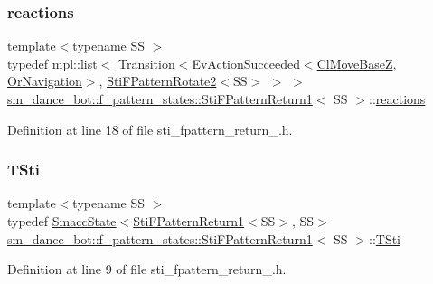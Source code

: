 \subsubsection{\texorpdfstring{reactions}{reactions}}
{\footnotesize\ttfamily template$<$typename SS $>$ \\
typedef mpl\+::list$<$ Transition$<$Ev\+Action\+Succeeded$<$\hyperlink{classmove__base__z__client_1_1ClMoveBaseZ}{Cl\+Move\+BaseZ}, \hyperlink{classsm__dance__bot_1_1OrNavigation}{Or\+Navigation}$>$, \hyperlink{structsm__dance__bot_1_1f__pattern__states_1_1StiFPatternRotate2}{Sti\+F\+Pattern\+Rotate2}$<$SS$>$ $>$ $>$ \hyperlink{structsm__dance__bot_1_1f__pattern__states_1_1StiFPatternReturn1}{sm\+\_\+dance\+\_\+bot\+::f\+\_\+pattern\+\_\+states\+::\+Sti\+F\+Pattern\+Return1}$<$ SS $>$\+::\hyperlink{structsm__dance__bot_1_1f__pattern__states_1_1StiFPatternReturn1_a2fcaf186ce44b90735584e304831f944}{reactions}}



Definition at line 18 of file sti\+\_\+fpattern\+\_\+return\+\_.\+h.

\mbox{\label{structsm__dance__bot_1_1f__pattern__states_1_1StiFPatternReturn1_afd0d5d7e8dc6ad87f7314176d86d919e}} 
\subsubsection{\texorpdfstring{T\+Sti}{TSti}}
{\footnotesize\ttfamily template$<$typename SS $>$ \\
typedef \hyperlink{classSmaccState}{Smacc\+State}$<$\hyperlink{structsm__dance__bot_1_1f__pattern__states_1_1StiFPatternReturn1}{Sti\+F\+Pattern\+Return1}$<$SS$>$, SS$>$ \hyperlink{structsm__dance__bot_1_1f__pattern__states_1_1StiFPatternReturn1}{sm\+\_\+dance\+\_\+bot\+::f\+\_\+pattern\+\_\+states\+::\+Sti\+F\+Pattern\+Return1}$<$ SS $>$\+::\hyperlink{structsm__dance__bot_1_1f__pattern__states_1_1StiFPatternReturn1_afd0d5d7e8dc6ad87f7314176d86d919e}{T\+Sti}}



Definition at line 9 of file sti\+\_\+fpattern\+\_\+return\+\_.\+h.



